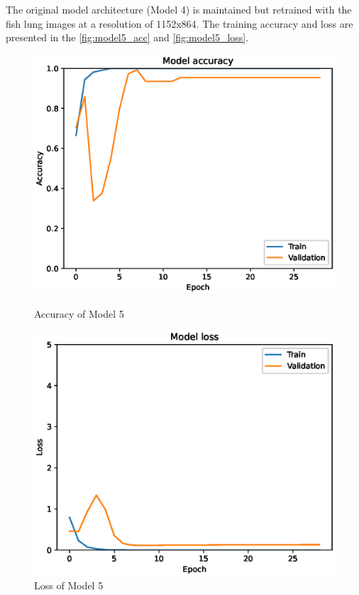The original model architecture (Model 4) is maintained but retrained with the fish lung images at a resolution of 1152x864. The training accuracy and loss are presented in the \autoref{fig:model5_acc} and \autoref{fig:model5_loss}.

\begin{figure}[H]
    \centering
    \begin{minipage}{0.45\textwidth}
        \centering
        \includegraphics[width=\textwidth]{./fig/fish_lung/accuracy5.eps}
        \caption{Accuracy of Model 5}
        \label{fig:model5_acc}
    \end{minipage}
    \begin{minipage}{0.45\textwidth}
        \centering
        \includegraphics[width=\textwidth]{./fig/fish_lung/loss5.eps}
        \caption{Loss of Model 5}
        \label{fig:model5_loss}
    \end{minipage}
\end{figure}


